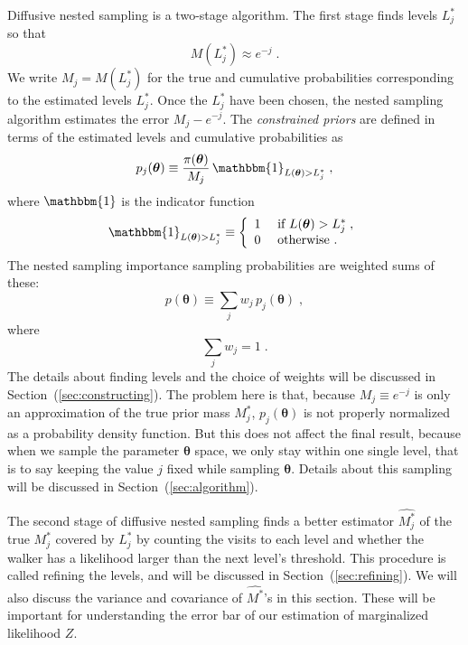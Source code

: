 \documentclass[letterpaper, preprint]{aastex}
\newcommand{\bth} {\boldsymbol \theta}
\begin{document}
Diffusive nested sampling is a two-stage algorithm. 
The first stage finds levels $L^*_j$ so that
\begin{equation}
M(L^*_j) \approx e^{-j}\; .
\end{equation}
We write $M_j = M(L^*_j)$ for the true and cumulative probabilities corresponding to the estimated 
levels $L^*_j$. 
Once the $L^*_j$ have been chosen, the nested sampling algorithm estimates the error 
$M_j - e^{-j}$.
The {\em constrained priors} are defined in terms of the estimated levels and cumulative probabilities as
\begin{equation} 
p_{j}(\bth) \equiv \frac{\pi(\bth)}{M_j}\,\mathbbm{1}_{L(\bth)>L_j^*} \; ,
\label{eq:constrained-prior}
\end{equation}
where $\mathbbm{1}$ is the indicator function
\begin{eqnarray}
\mathbbm{1}_{L(\bth)>L_j^*} \equiv \left\{ \begin{array}{ll}
               1 & \mbox{ if } L(\bth)>L_j^*\; ,\\
               0 & \mbox{ otherwise .} \end{array}\right.
\end{eqnarray}
The nested sampling importance sampling probabilities are weighted sums of these:
\begin{equation}
p(\bth) \equiv \sum_{j} w_j\,p_{j}(\bth) \; ,
\end{equation}
where 
\begin{equation}
\sum_j w_j = 1 \; .
\end{equation}
The details about finding levels and the choice of weights will be discussed in Section~(\ref{sec:constructing}). The problem here is that, because $M_j \equiv e^{-j}$ is only an approximation of the true prior mass $M^*_j$, $p_j(\bth)$ is not properly normalized as a probability density function. But this does not affect the final result, because when we sample the parameter $\bth$ space, we only stay within one single level, that is to say keeping the value $j$ fixed while sampling $\bth$. Details about this sampling will be discussed in Section~(\ref{sec:algorithm}). 

The second stage of diffusive nested sampling finds a better estimator $\widehat{M^*_j}$ of the true $M^*_j$ covered by $L^*_j$ by counting the visits to each level and whether the walker has a likelihood larger than the next level's threshold. This procedure is called refining the levels, and will be discussed in Section~(\ref{sec:refining}). We will also discuss the variance and covariance of $\widehat{M^*}$'s in this section. These will be important for understanding the error bar of our estimation of marginalized likelihood $Z$.
\end{document}
